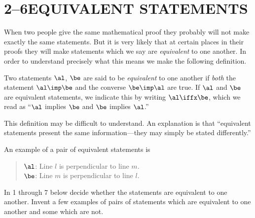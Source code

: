 \documentclass[11pt]{book}
\theoremstyle{bkplain}
\theoremstyle{XIplainnote}
\theoremstyle{bkplain}
\theoremstyle{bkplain}
\begin{document}
\section*{2--6\quad EQUIVALENT STATEMENTS}

When two people give the same mathematical proof they probably will not make
exactly the same statements. But it is very likely that at certain places in their
proofs they will make statements which we say are \emph{equivalent} to one
another. In order to understand precisely what this means we make the following
definition.

\begin{definition}
Two statements $\al$, $\be$ are said to be \emph{equivalent} to one another if
\emph{both} the statement $\al \imp \be$ and the converse $\be \imp \al$ are true.
If $\al$ and $\be$ are equivalent statements, we indicate this by writing
$\al \iffx \be$, which we read as ``$\al$ implies $\be$ and $\be$ implies $\al$.''
\end{definition}

This definition may be difficult to understand. An explanation is that
``equivalent statements present the same information---they may simply be stated
differently.''

An example of a pair of equivalent statements is

\begin{quote}
$\al$: Line $l$ is perpendicular to line $m$.\\
$\be$: Line $m$ is perpendicular to line $l$.
\end{quote}


In 1 through 7 below decide whether the statements are equivalent to one another.
Invent a few examples of pairs of statements which are equivalent to one another
and some which are not.
\end{document}

